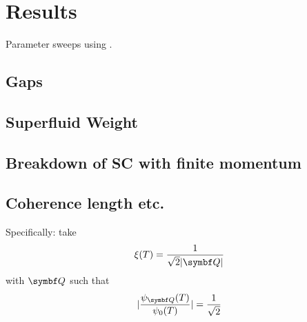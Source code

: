 \documentclass[../notes.tex]{subfiles}
\begin{document}
	
\chapter{Results}

Parameter sweeps using \cite{bachParasweepTemplatebasedUtility2021}.

\section{Gaps}

\section{Superfluid Weight}

\section{Breakdown of SC with finite momentum}

\section{Coherence length etc.}


Specifically: take
\begin{equation}
	\xi(T) = \frac{1}{\sqrt{2} \vert \vb{Q} \vert}
\end{equation}
with \(\vb{Q}\) such that
\begin{equation}
	\vert \frac{\psi_{\vb{Q}}(T)}{\psi_0 (T)} \vert = \frac{1}{\sqrt{2}}
\end{equation}
	
\end{document}

